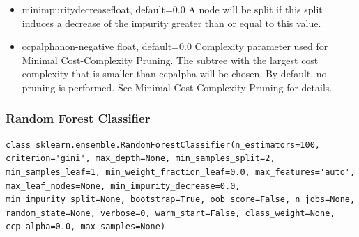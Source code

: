 \documentclass[12pt]{article}
\begin{document}
\begin{itemize}
\item
min\textunderscore impurity\textunderscore decreasefloat, default=0.0
A node will be split if this split induces a decrease of the impurity greater than or equal to this value.

\item
ccp\textunderscore alphanon-negative float, default=0.0
Complexity parameter used for Minimal Cost-Complexity Pruning. The subtree with the largest cost complexity that is smaller than ccp\textunderscore alpha will be chosen. By default, no pruning is performed. See Minimal Cost-Complexity Pruning for details.

\end{itemize}

\newpage
\subsubsection{Random Forest Classifier}
\begin{lstlisting}
class sklearn.ensemble.RandomForestClassifier(n_estimators=100, criterion='gini', max_depth=None, min_samples_split=2, min_samples_leaf=1, min_weight_fraction_leaf=0.0, max_features='auto', max_leaf_nodes=None, min_impurity_decrease=0.0, min_impurity_split=None, bootstrap=True, oob_score=False, n_jobs=None, random_state=None, verbose=0, warm_start=False, class_weight=None, ccp_alpha=0.0, max_samples=None)
\end{lstlisting}
\end{document}
